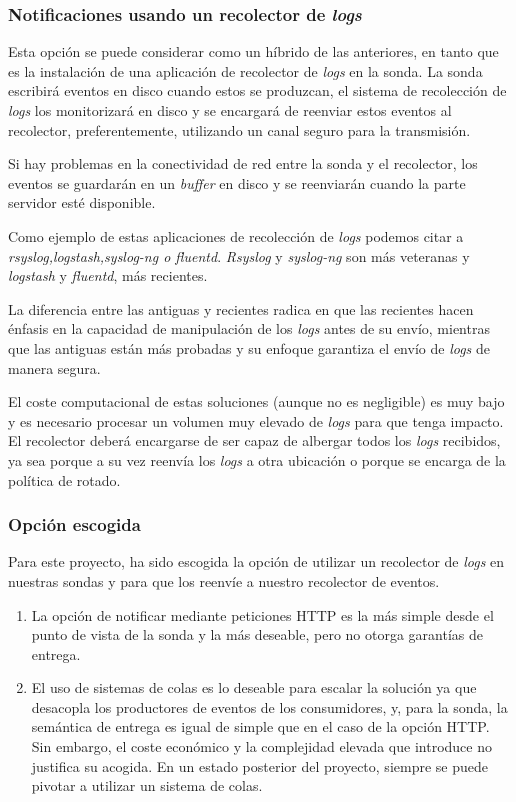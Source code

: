 \subsubsection{Notificaciones usando un recolector de \emph{logs}}
\label{subsubsec:usando-rsyslog}

Esta opción se puede considerar como un híbrido de las anteriores, en tanto que es la instalación de una aplicación de recolector de \emph{logs} en la sonda. 
La sonda escribirá eventos en disco cuando estos se produzcan, el sistema de recolección de \emph{logs} los monitorizará en disco y
se encargará de reenviar estos eventos al recolector, preferentemente, utilizando un canal seguro para la transmisión.

Si hay problemas en la conectividad de red entre la sonda y el recolector, los eventos se guardarán en un \emph{buffer} en disco y se reenviarán cuando la parte servidor esté disponible.

Como ejemplo de estas aplicaciones de recolección de \emph{logs} podemos citar a \emph{rsyslog,logstash,syslog-ng o fluentd}. \emph{Rsyslog} y \emph{syslog-ng} son más veteranas y \emph{logstash} y \emph{fluentd}, más recientes. 

La diferencia entre las antiguas y recientes radica en que las recientes hacen énfasis en la capacidad de manipulación de los \emph{logs} antes de su envío, mientras
que las antiguas están más probadas y su enfoque garantiza el envío de \emph{logs} de manera segura.

El coste computacional de estas soluciones (aunque no es negligible) es muy bajo y es necesario procesar un volumen muy elevado de \emph{logs} para que tenga impacto.
El recolector deberá encargarse de ser capaz de albergar todos los \emph{logs} recibidos, ya sea porque a su vez reenvía los \emph{logs} a otra ubicación o porque se encarga de la 
política de rotado. 

\subsubsection{Opción escogida}

Para este proyecto, ha sido escogida la opción de utilizar un recolector de \emph{logs} en nuestras sondas y para que los reenvíe a nuestro recolector de eventos. 

\begin{enumerate}
    \item La opción de notificar mediante peticiones HTTP es la más simple desde el punto de vista de la sonda y la más deseable, pero no otorga garantías de entrega.
    \item El uso de sistemas de colas es lo deseable para escalar la solución ya que desacopla los productores de eventos de los consumidores,
     y, para la sonda, la semántica de entrega es igual de simple que en el caso de la opción HTTP. Sin embargo, el coste económico y la complejidad elevada que introduce no justifica su acogida.
     En un estado posterior del proyecto, siempre se puede pivotar a utilizar un sistema de colas.
\end{enumerate}

